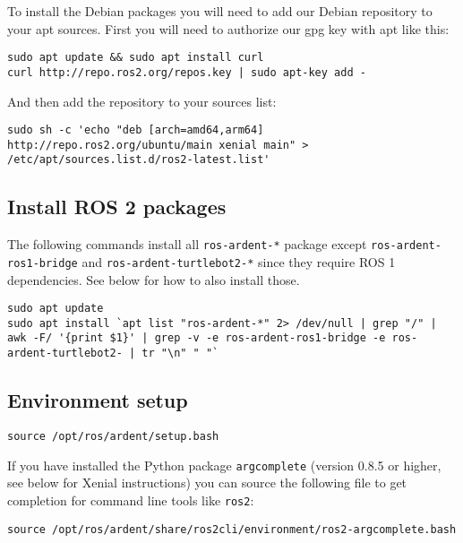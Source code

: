 To install the Debian packages you will need to add our Debian
repository to your apt sources. First you will need to authorize our gpg
key with apt like this:

\begin{verbatim}
sudo apt update && sudo apt install curl
curl http://repo.ros2.org/repos.key | sudo apt-key add -
\end{verbatim}

And then add the repository to your sources list:

\begin{verbatim}
sudo sh -c 'echo "deb [arch=amd64,arm64] http://repo.ros2.org/ubuntu/main xenial main" > /etc/apt/sources.list.d/ros2-latest.list'
\end{verbatim}

\hypertarget{install-ros-2-packages}{%
\subsection{Install ROS 2 packages}\label{install-ros-2-packages}}

The following commands install all \texttt{ros-ardent-*} package except
\texttt{ros-ardent-ros1-bridge} and \texttt{ros-ardent-turtlebot2-*}
since they require ROS 1 dependencies. See below for how to also install
those.

\begin{verbatim}
sudo apt update
sudo apt install `apt list "ros-ardent-*" 2> /dev/null | grep "/" | awk -F/ '{print $1}' | grep -v -e ros-ardent-ros1-bridge -e ros-ardent-turtlebot2- | tr "\n" " "`
\end{verbatim}

\hypertarget{environment-setup}{%
\subsection{Environment setup}\label{environment-setup}}

\begin{verbatim}
source /opt/ros/ardent/setup.bash
\end{verbatim}

If you have installed the Python package \texttt{argcomplete} (version
0.8.5 or higher, see below for Xenial instructions) you can source the
following file to get completion for command line tools like
\texttt{ros2}:

\begin{verbatim}
source /opt/ros/ardent/share/ros2cli/environment/ros2-argcomplete.bash
\end{verbatim}

